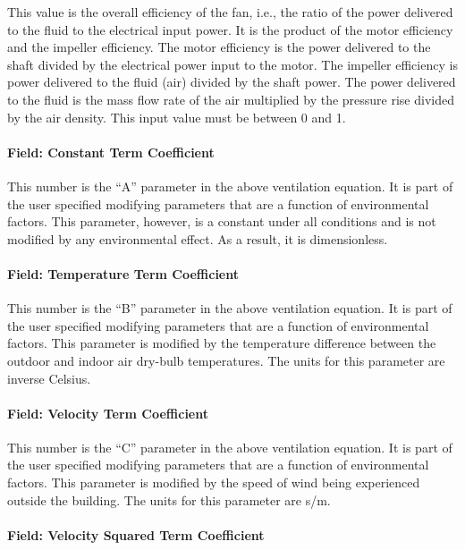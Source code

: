 This value is the overall efficiency of the fan, i.e., the ratio of the power delivered to the fluid to the electrical input power. It is the product of the motor efficiency and the impeller efficiency. The motor efficiency is the power delivered to the shaft divided by the electrical power input to the motor. The impeller efficiency is power delivered to the fluid (air) divided by the shaft power. The power delivered to the fluid is the mass flow rate of the air multiplied by the pressure rise divided by the air density. This input value must be between 0 and 1.

\paragraph{Field: Constant Term Coefficient}\label{field-constant-term-coefficient-1}

This number is the ``A'' parameter in the above ventilation equation. It is part of the user specified modifying parameters that are a function of environmental factors. This parameter, however, is a constant under all conditions and is not modified by any environmental effect. As a result, it is dimensionless.

\paragraph{Field: Temperature Term Coefficient}\label{field-temperature-term-coefficient-1}

This number is the ``B'' parameter in the above ventilation equation. It is part of the user specified modifying parameters that are a function of environmental factors. This parameter is modified by the temperature difference between the outdoor and indoor air dry-bulb temperatures. The units for this parameter are inverse Celsius.

\paragraph{Field: Velocity Term Coefficient}\label{field-velocity-term-coefficient-1}

This number is the ``C'' parameter in the above ventilation equation. It is part of the user specified modifying parameters that are a function of environmental factors. This parameter is modified by the speed of wind being experienced outside the building. The units for this parameter are s/m.

\paragraph{Field: Velocity Squared Term Coefficient}\label{field-velocity-squared-term-coefficient-1}

